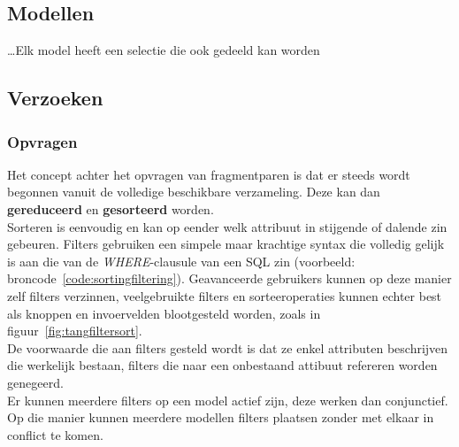 \subsection{Modellen}

\ldots Elk model heeft een selectie die ook gedeeld kan worden

\subsection{Verzoeken}

\subsubsection{Opvragen}
Het concept achter het opvragen van fragmentparen is dat er steeds wordt begonnen vanuit de volledige beschikbare verzameling. Deze kan dan \textbf{gereduceerd} en \textbf{gesorteerd} worden. \\

Sorteren is eenvoudig en kan op eender welk attribuut in stijgende of dalende zin gebeuren. Filters gebruiken een simpele maar krachtige syntax die volledig gelijk is aan die van de \emph{WHERE}-clausule van een SQL zin (voorbeeld: broncode~\ref{code:sortingfiltering}). Geavanceerde gebruikers kunnen op deze manier zelf filters verzinnen, veelgebruikte filters en sorteeroperaties kunnen echter best als knoppen en invoervelden blootgesteld worden, zoals in figuur~\ref{fig:tangfiltersort}.\\

De voorwaarde die aan filters gesteld wordt is dat ze enkel attributen beschrijven die werkelijk bestaan, filters die naar een onbestaand attibuut refereren worden genegeerd.\\

Er kunnen meerdere filters op een model actief zijn, deze werken dan conjunctief. Op die manier kunnen meerdere modellen filters plaatsen zonder met elkaar in conflict te komen. 



